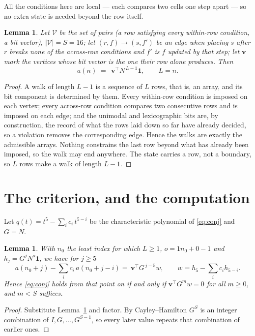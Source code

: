 \documentclass[11pt,a4paper]{article}
\theoremstyle{plain}
\newtheorem{lemma}[theorem]{Lemma}
\theoremstyle{definition}
\begin{document}
All the conditions here are local --- each compares two cells one step apart ---
so no extra state is needed beyond the row itself.

\begin{lemma}\label{lem:walk}
Let $\mathcal V$ be the set of pairs (a row satisfying every within-row condition, a
bit vector), $|\mathcal V|=S=16$; let $(r,f)\to(s,f')$ be an edge when placing $s$ after $r$
breaks none of the across-row conditions and $f'$ is $f$ updated by that step; let
$\mathbf{v}$ mark the vertices whose bit vector is the one their row alone produces.
Then
\[
a(n)\;=\;\,\mathbf{v}^{\!\top}N^{\,L-1}\mathbf{1},\qquad L=n.
\]
\end{lemma}

\begin{proof}
A walk of length $L-1$ is a sequence of $L$ rows, that is, an array, and its bit component
is determined by them. Every within-row condition is imposed on each vertex; every
across-row condition compares two consecutive rows and is imposed on each edge; and the
unimodal and lexicographic bits are, by construction, the record of what the rows laid down
so far have already decided, so a violation removes the corresponding edge. Hence the walks
are exactly the admissible arrays. Nothing constrains the last row beyond what has already
been imposed, so the walk may end anywhere. The state carries a row, not a boundary, so
$L$ rows make a walk of length $L-1$.
\end{proof}

\section{The criterion, and the computation}

Let $q(t)=t^{5}-\sum_i c_i\,t^{5-i}$ be the characteristic polynomial of
\eqref{eq:conj} and $G=N$.

\begin{lemma}\label{lem:crit}
With $n_0$ the least index for which $L\ge1$, $o=1n_0+0-1$ and
$h_j=G^{j}N^{o}\mathbf{1}$, we have for $j\ge5$
\[
a(n_0+j)-\sum_i c_i\,a(n_0+j-i)=\,\mathbf{v}^{\!\top}G^{\,j-5}w,
\qquad w=h_{5}-\sum_i c_ih_{5-i} .
\]
Hence \eqref{eq:conj} holds from that point on if and only if
$\mathbf{v}^{\!\top}G^{m}w=0$ for all $m\ge0$, and $m<S$ suffices.
\end{lemma}

\begin{proof}
Substitute Lemma~\ref{lem:walk} and factor. By Cayley--Hamilton $G^{S}$ is an integer
combination of $I,G,\dots,G^{S-1}$, so every later value repeats that combination of
earlier ones.
\end{proof}
\end{document}
